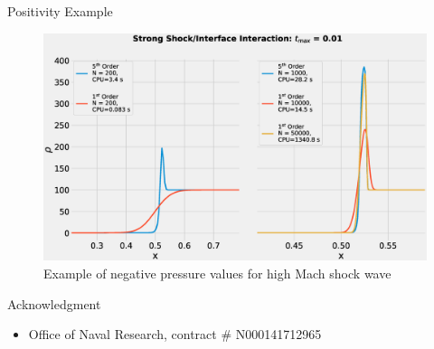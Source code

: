 \documentclass[10pt]{beamer}
\begin{document}
\begin{frame}{Positivity Example}
  \begin{figure}[H]
    \centering
    \includegraphics[scale=0.275]{ShockInterfaceComparison.eps}\caption{Example of negative pressure values for high Mach shock wave}
    \end{figure}
\end{frame}



\begin{frame}{Acknowledgment}
  \begin{itemize}
  \item
    Office of Naval Research, contract $\#$ N000141712965
  \end{itemize}  
  
\end{frame}  
\end{document}
